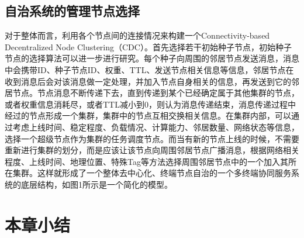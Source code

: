 \subsection{自治系统的管理节点选择}
对于整体而言，利用各个节点间的连接情况来构建一个Connectivity-based Decentralized Node Clustering（CDC）。首先选择若干初始种子节点，初始种子节点的选择算法可以进一步进行研究。每个种子向周围的邻居节点发送消息，消息中会携带ID、种子节点ID、权重、TTL、发送节点相关信息等信息，邻居节点在收到消息后会对该消息做一定处理，并加入节点自身相关的信息，再发送到它的邻居节点。节点消息不断传递下去，直到传递到某个已经确定属于其他集群的节点，或者权重信息消耗尽，或者TTL减小到0，则认为消息传递结束，消息传递过程中经过的节点形成一个集群，集群中的节点互相交换相关信息。在集群内部，可以通过考虑上线时间、稳定程度、负载情况、计算能力、邻居数量、网络状态等信息，选择一个超级节点作为集群的任务调度节点。而当有新的节点上线的时候，不需要重新进行集群的划分，而是应该让该节点向周围邻居节点广播消息，根据网络相关程度、上线时间、地理位置、特殊Tag等方法选择周围邻居节点中的一个加入其所在集群。这样就形成了一个整体去中心化、终端节点自治的一个多终端协同服务系统的底层结构，如图1所示是一个简化的模型。

\section{本章小结}\label{sec:service_system_summary}